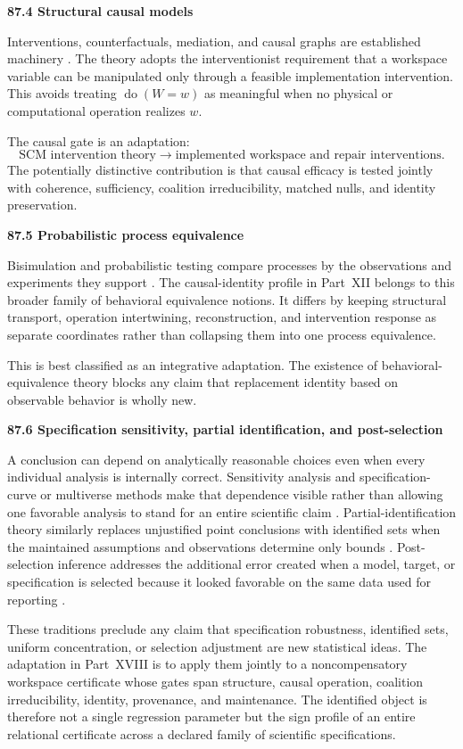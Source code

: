 \documentclass[11pt,letterpaper]{article}
\newcommand{\subtopic}[1]{%
 \vspace{0.45em}
 {\bfseries\color{AccentColor} #1\par}
}
\theoremstyle{plain}
\theoremstyle{definition}
\begin{document}
\subtopic{87.4 Structural causal models}

Interventions, counterfactuals, mediation, and causal graphs are established
machinery \cite{Pearl2009}. The theory adopts the interventionist
requirement that a workspace variable can be manipulated only through a
feasible implementation intervention. This avoids treating
\(\operatorname{do}(W=w)\) as meaningful when no physical or computational
operation realizes \(w\).

The causal gate is an adaptation:
\[
\text{SCM intervention theory}
\longrightarrow
\text{implemented workspace and repair interventions}.
\]
The potentially distinctive contribution is that causal efficacy is tested
jointly with coherence, sufficiency, coalition irreducibility, matched nulls,
and identity preservation.

\subtopic{87.5 Probabilistic process equivalence}

Bisimulation and probabilistic testing compare processes by the observations
and experiments they support \cite{LarsenSkou1991}. The causal-identity profile
in Part~XII belongs to this broader family of behavioral equivalence notions.
It differs by keeping structural transport, operation intertwining,
reconstruction, and intervention response as separate coordinates rather than
collapsing them into one process equivalence.

This is best classified as an integrative adaptation. The existence of
behavioral-equivalence theory blocks any claim that replacement identity based
on observable behavior is wholly new.

\subtopic{87.6 Specification sensitivity, partial identification, and post-selection}

A conclusion can depend on analytically reasonable choices even when every
individual analysis is internally correct. Sensitivity analysis and
specification-curve or multiverse methods make that dependence visible rather
than allowing one favorable analysis to stand for an entire scientific claim
\cite{Leamer1983,SteegenEtAl2016,SimonsohnEtAl2020}. Partial-identification
theory similarly replaces unjustified point conclusions with identified sets
when the maintained assumptions and observations determine only bounds
\cite{Manski2003,ImbensManski2004}. Post-selection inference addresses the
additional error created when a model, target, or specification is selected
because it looked favorable on the same data used for reporting
\cite{BerkEtAl2013}.

These traditions preclude any claim that specification robustness, identified
sets, uniform concentration, or selection adjustment are new statistical
ideas. The adaptation in Part~XVIII is to apply them jointly to a
noncompensatory workspace certificate whose gates span structure, causal
operation, coalition irreducibility, identity, provenance, and maintenance.
The identified object is therefore not a single regression parameter but the
sign profile of an entire relational certificate across a declared family of
scientific specifications.
\end{document}
